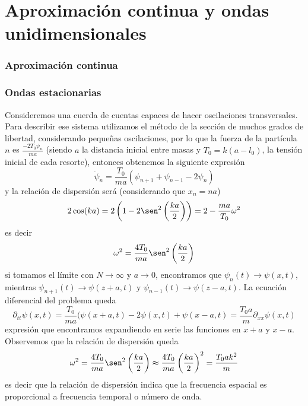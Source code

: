 \documentclass[a4paper,spanish]{article}
\numberwithin{equation}{section}
\begin{document}
\part{Aproximaci\'on continua y ondas unidimensionales}

\section{Aproximaci\'on continua}

\section{Ondas estacionarias}
			Consideremos una cuerda de cuentas capaces de hacer oscilaciones transversales. Para describir ese sistema utilizamos el m\'etodo de la secci\'on de muchos grados de libertad, considerando peque\~nas oscilaciones, por lo que la fuerza de la part\'icula $n$ es $\frac{- 2 T_0 \psi_n}{m a}$ (siendo $a$ la distancia inicial entre masas y $T_0 = k (a - l_0)$, la tensi\'on inicial de cada resorte), entonces obtenemos la siguiente expresi\'on
			\begin{equation*}
				\ddot{\psi}_n = \frac{T_0}{m a} (\psi_{n+1} + \psi_{n-1} - 2 \psi_n)
			\end{equation*}
			y la relaci\'on de dispersi\'on ser\'a (considerando que $x_n = n a$)
			\begin{equation*}
				2 \cos(k a) = 2 \left(1 - 2 \sen^2\left(\frac{k a}{2}\right)\right) = 2 - \frac{m a}{T_0} \omega^2
			\end{equation*}
			es decir
			\begin{equation*}
				\omega^2 = \frac{4 T_0}{m a} \sen^2\left(\frac{k a}{2}\right)
			\end{equation*}
			si tomamos el l\'imite con $N \to \infty$ y $a \to 0$, encontramos que $\psi_n(t) \to \psi(x,t)$, mientras $\psi_{n+1}(t) \to \psi(z + a,t)$ y $\psi_{n-1}(t) \to \psi(z - a,t)$. La ecuaci\'on diferencial del problema queda
			\begin{equation*}
				\partial_{tt} \psi(x,t) = \frac{T_0}{m a} (\psi(x+a,t) - 2 \psi(x,t) + \psi(x-a,t) = \frac{T_0 a}{m} \partial_{xx} \psi(x,t)
			\end{equation*}
			expresi\'on que encontramos expandiendo en serie las funciones en $x +a$ y $x-a$. Observemos que la relaci\'on de dispersi\'on queda
			\begin{equation*}
				\omega^2 = \frac{4 T_0}{m a} \sen^2\left(\frac{k a}{2}\right) \approx \frac{4 T_0}{m a} \left(\frac{k a}{2}\right)^2 = \frac{T_0 a k^2}{m}
			\end{equation*}
			es decir que la relaci\'on de dispersi\'on indica que la frecuencia espacial es proporcional a frecuencia temporal o n\'umero de onda.
			
\end{document}
